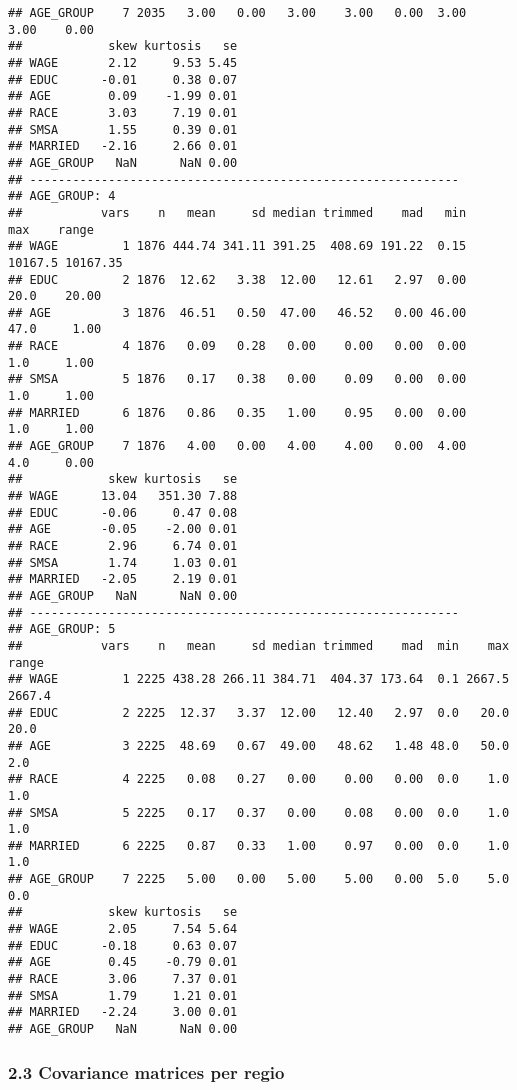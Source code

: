 \documentclass[
]{article}
\begin{document}
\begin{verbatim}
## AGE_GROUP    7 2035   3.00   0.00   3.00    3.00   0.00  3.00    3.00    0.00
##            skew kurtosis   se
## WAGE       2.12     9.53 5.45
## EDUC      -0.01     0.38 0.07
## AGE        0.09    -1.99 0.01
## RACE       3.03     7.19 0.01
## SMSA       1.55     0.39 0.01
## MARRIED   -2.16     2.66 0.01
## AGE_GROUP   NaN      NaN 0.00
## ------------------------------------------------------------ 
## AGE_GROUP: 4
##           vars    n   mean     sd median trimmed    mad   min     max    range
## WAGE         1 1876 444.74 341.11 391.25  408.69 191.22  0.15 10167.5 10167.35
## EDUC         2 1876  12.62   3.38  12.00   12.61   2.97  0.00    20.0    20.00
## AGE          3 1876  46.51   0.50  47.00   46.52   0.00 46.00    47.0     1.00
## RACE         4 1876   0.09   0.28   0.00    0.00   0.00  0.00     1.0     1.00
## SMSA         5 1876   0.17   0.38   0.00    0.09   0.00  0.00     1.0     1.00
## MARRIED      6 1876   0.86   0.35   1.00    0.95   0.00  0.00     1.0     1.00
## AGE_GROUP    7 1876   4.00   0.00   4.00    4.00   0.00  4.00     4.0     0.00
##            skew kurtosis   se
## WAGE      13.04   351.30 7.88
## EDUC      -0.06     0.47 0.08
## AGE       -0.05    -2.00 0.01
## RACE       2.96     6.74 0.01
## SMSA       1.74     1.03 0.01
## MARRIED   -2.05     2.19 0.01
## AGE_GROUP   NaN      NaN 0.00
## ------------------------------------------------------------ 
## AGE_GROUP: 5
##           vars    n   mean     sd median trimmed    mad  min    max  range
## WAGE         1 2225 438.28 266.11 384.71  404.37 173.64  0.1 2667.5 2667.4
## EDUC         2 2225  12.37   3.37  12.00   12.40   2.97  0.0   20.0   20.0
## AGE          3 2225  48.69   0.67  49.00   48.62   1.48 48.0   50.0    2.0
## RACE         4 2225   0.08   0.27   0.00    0.00   0.00  0.0    1.0    1.0
## SMSA         5 2225   0.17   0.37   0.00    0.08   0.00  0.0    1.0    1.0
## MARRIED      6 2225   0.87   0.33   1.00    0.97   0.00  0.0    1.0    1.0
## AGE_GROUP    7 2225   5.00   0.00   5.00    5.00   0.00  5.0    5.0    0.0
##            skew kurtosis   se
## WAGE       2.05     7.54 5.64
## EDUC      -0.18     0.63 0.07
## AGE        0.45    -0.79 0.01
## RACE       3.06     7.37 0.01
## SMSA       1.79     1.21 0.01
## MARRIED   -2.24     3.00 0.01
## AGE_GROUP   NaN      NaN 0.00
\end{verbatim}

\subsubsection{\texorpdfstring{\textbf{2.3 Covariance matrices per
regio}}{2.3 Covariance matrices per regio}}\label{covariance-matrices-per-regio}
\end{document}
